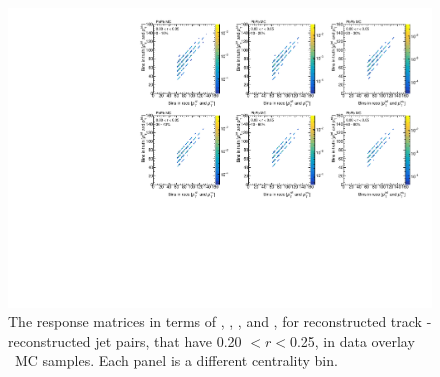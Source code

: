 \begin{figure}[ht]
\centering
\includegraphics[page=5, width=1.0\textwidth]{figures/main/corrections/resp_matrix_ChPS_PbPb_MC.pdf}
\caption{The response matrices in terms of \ptjetreco, \ptjettruth, \pttrkreco, and \pttrktruth, for reconstructed track - reconstructed jet pairs, that have 0.20 $< r < $0.25, in data overlay \pbpb\ MC samples. Each panel is a different centrality bin.}
\label{fig:PbPb_ChPS_respmatrix}
\end{figure}

